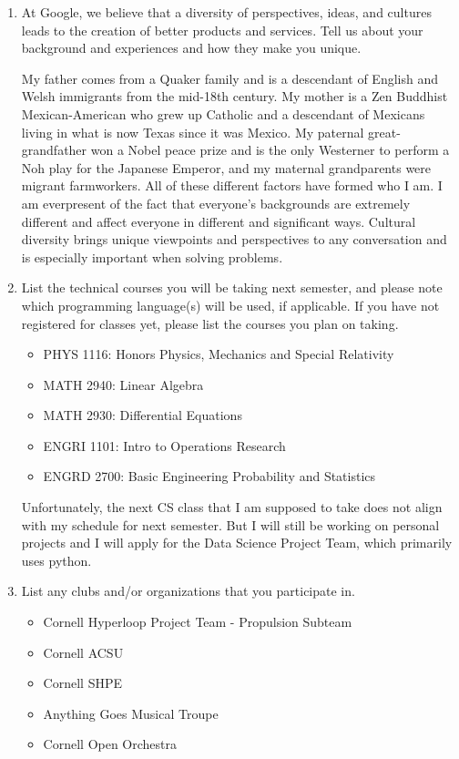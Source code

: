 \documentclass[10pt,a4paper]{article}
\begin{document}
\begin{enumerate}
  \newpage
  \item At Google, we believe that a diversity of perspectives, ideas, and cultures leads to the creation of better products and services. Tell us about your background and experiences and how they make you unique. \par \smallskip
  My father comes from a Quaker family and is a descendant of English and Welsh immigrants from the mid-18th century. My mother is a Zen Buddhist Mexican-American who grew up Catholic and a descendant of Mexicans living in what is now Texas since it was Mexico. My paternal great-grandfather won a Nobel peace prize and is the only Westerner to perform a Noh play for the Japanese Emperor, and my maternal grandparents were migrant farmworkers. All of these different factors have formed who I am. I am everpresent of the fact that everyone’s backgrounds are extremely different and affect everyone in different and significant ways. Cultural diversity brings unique viewpoints and perspectives to any conversation and is especially important when solving problems.

  \item List the technical courses you will be taking next semester, and please note which programming language(s) will be used, if applicable. If you have not registered for classes yet, please list the courses you plan on taking. \par \smallskip
  \begin{itemize}
    \item PHYS 1116: Honors Physics, Mechanics and Special Relativity
    \item MATH 2940: Linear Algebra
    \item MATH 2930: Differential Equations
    \item ENGRI 1101: Intro to Operations Research
    \item ENGRD 2700: Basic Engineering Probability and Statistics
  \end{itemize}
  Unfortunately, the next CS class that I am supposed to take does not align with my schedule for next semester. But I will still be working on personal projects and I will apply for the Data Science Project Team, which primarily uses python.

  \item List any clubs and/or organizations that you participate in.\par \smallskip
  \begin{itemize}
    \item Cornell Hyperloop Project Team - Propulsion Subteam
    \item Cornell ACSU
    \item Cornell SHPE
    \item Anything Goes Musical Troupe
    \item Cornell Open Orchestra
  \end{itemize}
\end{enumerate}
\nocite{*}
\end{document}
